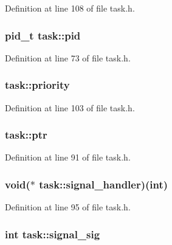 Definition at line 108 of file task.\+h.

\hypertarget{structtask_ab56448ae42a75825ea923bd86648f3ae}{
\subsubsection[{pid}]{\setlength{\rightskip}{0pt plus 5cm}pid\+\_\+t task\+::pid}}\label{structtask_ab56448ae42a75825ea923bd86648f3ae}


Definition at line 73 of file task.\+h.

\hypertarget{structtask_a9ab46b5a6e7c471f1fe32db13e6636a2}{
\subsubsection[{priority}]{ task\+::priority}}\label{structtask_a9ab46b5a6e7c471f1fe32db13e6636a2}


Definition at line 103 of file task.\+h.

\hypertarget{structtask_afbc0623ab058e402e92ea084dc37ab6a}{
\subsubsection[{ptr}]{ task\+::ptr}}\label{structtask_afbc0623ab058e402e92ea084dc37ab6a}


Definition at line 91 of file task.\+h.

\hypertarget{structtask_aea4c9382e5f4f148a0a74c0680729cf0}{
\subsubsection[{signal\+\_\+handler}]{\setlength{\rightskip}{0pt plus 5cm}void($\ast$ task\+::signal\+\_\+handler)(int)}}\label{structtask_aea4c9382e5f4f148a0a74c0680729cf0}


Definition at line 95 of file task.\+h.

\hypertarget{structtask_a3d6991558f05258094bbef5c47073928}{
\subsubsection[{signal\+\_\+sig}]{\setlength{\rightskip}{0pt plus 5cm}int task\+::signal\+\_\+sig}}\label{structtask_a3d6991558f05258094bbef5c47073928}


